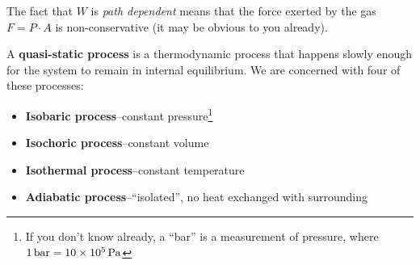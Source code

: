 The fact that $W$ is \emph{path dependent} means that the force exerted by
the gas $F=P\cdot A$ is non-conservative (it may be obvious to you already).

A \textbf{quasi-static process} is a thermodynamic process that happens slowly
enough for the system to remain in internal equilibrium. We are concerned with
four of these processes:
\begin{itemize}
\item\textbf{Isobaric process}--constant pressure\footnote{If you don't know
  already, a ``bar'' is a measurement of pressure, where
  $\SI1{bar}=\SI{10e5}{\pascal}$}
\item\textbf{Isochoric process}--constant volume
\item\textbf{Isothermal process}--constant temperature
\item\textbf{Adiabatic process}--``isolated'', no heat exchanged with
  surrounding
\end{itemize}


